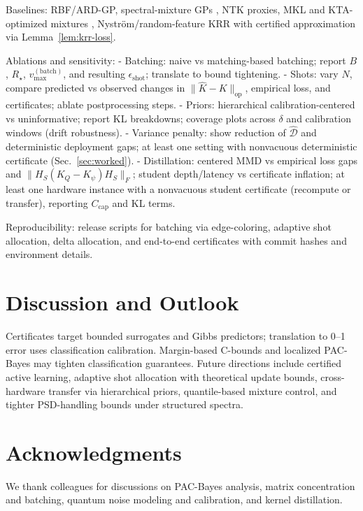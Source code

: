 \documentclass{article}
\begin{document}
Baselines: RBF/ARD-GP, spectral-mixture GPs \cite{rasmussen2006gaussian, wilson2013gp}, NTK proxies, MKL and KTA-optimized mixtures \cite{cortes2010two, cortes2012algorithms}, Nystr\"om/random-feature KRR with certified approximation via Lemma~\ref{lem:krr-loss}.

Ablations and sensitivity:
- Batching: naive vs matching-based batching; report $B$, $R_\star$, $v_{\max}^{(\mathrm{batch})}$, and resulting $\epsilon_{\mathrm{shot}}$; translate to bound tightening.
- Shots: vary $N$, compare predicted vs observed changes in $\|\widehat{K}-K\|_{\mathrm{op}}$, empirical loss, and certificates; ablate postprocessing steps.
- Priors: hierarchical calibration-centered vs uninformative; report KL breakdowns; coverage plots across $\delta$ and calibration windows (drift robustness).
- Variance penalty: show reduction of $\widehat{\mathcal{D}}$ and deterministic deployment gaps; at least one setting with nonvacuous deterministic certificate (Sec.~\ref{sec:worked}).
- Distillation: centered MMD vs empirical loss gaps and $\|H_S(K_Q-K_\psi)H_S\|_F$; student depth/latency vs certificate inflation; at least one hardware instance with a nonvacuous student certificate (recompute or transfer), reporting $C_{\mathrm{cap}}$ and KL terms.

Reproducibility: release scripts for batching via edge-coloring, adaptive shot allocation, delta allocation, and end-to-end certificates with commit hashes and environment details.

\section{Discussion and Outlook}
Certificates target bounded surrogates and Gibbs predictors; translation to 0–1 error uses classification calibration. Margin-based C-bounds \cite{germain2015risk} and localized PAC-Bayes \cite{rivasplata2020pacbayes} may tighten classification guarantees. Future directions include certified active learning, adaptive shot allocation with theoretical update bounds, cross-hardware transfer via hierarchical priors, quantile-based mixture control, and tighter PSD-handling bounds under structured spectra.

\section*{Acknowledgments}
We thank colleagues for discussions on PAC-Bayes analysis, matrix concentration and batching, quantum noise modeling and calibration, and kernel distillation.
\end{document}
